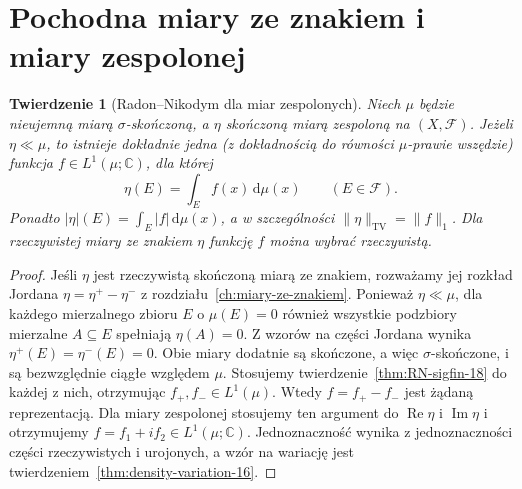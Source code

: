 \documentclass[11pt,a4paper,oneside]{book}
\numberwithin{equation}{chapter}
\theoremstyle{plain}
\newtheorem{twierdzenie}{Twierdzenie}[chapter]
\theoremstyle{definition}
\theoremstyle{remark}
\begin{document}
\section{Pochodna miary ze znakiem i miary zespolonej}
\begin{twierdzenie}[Radon--Nikodym dla miar zespolonych]
\label{thm:RN-complex-18}
Niech $\mu$ będzie nieujemną miarą $\sigma$-skończoną,
a $\eta$ skończoną miarą zespoloną na $(X,\mathcal F)$.
Jeżeli $\eta\ll\mu$, to istnieje dokładnie jedna
(z dokładnością do równości $\mu$-prawie wszędzie)
funkcja $f\in L^1(\mu;\mathbb C)$, dla której
\begin{equation}\label{eq:RN-complex-18}
\eta(E)=\int_E f(x)\,\mathrm d\mu(x)
\qquad(E\in\mathcal F).
\end{equation}
Ponadto $|\eta|(E)=\int_E|f|\,\mathrm d\mu(x)$,
a w szczególności $\|\eta\|_{\mathrm{TV}}=\|f\|_1$.
Dla rzeczywistej miary ze znakiem $\eta$ funkcję $f$
można wybrać rzeczywistą.
\end{twierdzenie}
\begin{proof}
Jeśli $\eta$ jest rzeczywistą skończoną miarą ze znakiem,
rozważamy jej rozkład Jordana
$\eta=\eta^+-\eta^-$ z rozdziału~\ref{ch:miary-ze-znakiem}.
Ponieważ $\eta\ll\mu$, dla każdego mierzalnego
zbioru $E$ o $\mu(E)=0$ również wszystkie podzbiory
mierzalne $A\subseteq E$ spełniają $\eta(A)=0$.
Z wzorów na części Jordana wynika
$\eta^+(E)=\eta^-(E)=0$. Obie miary dodatnie są
skończone, a więc $\sigma$-skończone, i są
bezwzględnie ciągłe względem $\mu$.
Stosujemy twierdzenie~\ref{thm:RN-sigfin-18} do każdej
z nich, otrzymując $f_+,f_-\in L^1(\mu)$.
Wtedy $f=f_+-f_-$ jest żądaną reprezentacją.
Dla miary zespolonej stosujemy ten argument do
$\operatorname{Re}\eta$ i $\operatorname{Im}\eta$
i otrzymujemy $f=f_1+if_2\in L^1(\mu;\mathbb C)$.
Jednoznaczność wynika z jednoznaczności części
rzeczywistych i urojonych, a wzór na wariację
jest twierdzeniem~\ref{thm:density-variation-16}.
\end{proof}
\end{document}
